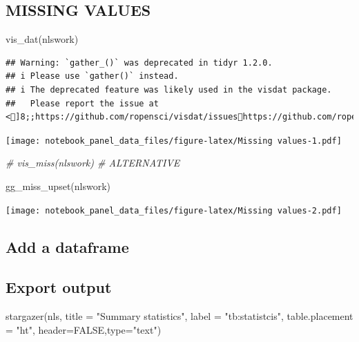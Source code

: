 \documentclass[
]{article}
\newenvironment{Shaded}{\begin{snugshade}}{\end{snugshade}}
\newcommand{\AttributeTok}[1]{\textcolor[rgb]{0.77,0.63,0.00}{#1}}
\newcommand{\CommentTok}[1]{\textcolor[rgb]{0.56,0.35,0.01}{\textit{#1}}}
\newcommand{\ConstantTok}[1]{\textcolor[rgb]{0.00,0.00,0.00}{#1}}
\newcommand{\FunctionTok}[1]{\textcolor[rgb]{0.00,0.00,0.00}{#1}}
\newcommand{\NormalTok}[1]{#1}
\newcommand{\StringTok}[1]{\textcolor[rgb]{0.31,0.60,0.02}{#1}}
\begin{document}
\hypertarget{missing-values}{%
\subsection{MISSING VALUES}\label{missing-values}}

\begin{Shaded}
\begin{Highlighting}[]
  \FunctionTok{vis\_dat}\NormalTok{(nlswork)}
\end{Highlighting}
\end{Shaded}

\begin{verbatim}
## Warning: `gather_()` was deprecated in tidyr 1.2.0.
## i Please use `gather()` instead.
## i The deprecated feature was likely used in the visdat package.
##   Please report the issue at <]8;;https://github.com/ropensci/visdat/issueshttps://github.com/ropensci/visdat/issues]8;;>.
\end{verbatim}

\texttt{[image: notebook\_panel\_data\_files/figure-latex/Missing values-1.pdf]}

\begin{Shaded}
\begin{Highlighting}[]
\CommentTok{\# vis\_miss(nlswork) \# ALTERNATIVE}

  \FunctionTok{gg\_miss\_upset}\NormalTok{(nlswork)}
\end{Highlighting}
\end{Shaded}

\texttt{[image: notebook\_panel\_data\_files/figure-latex/Missing values-2.pdf]}

\hypertarget{add-a-dataframe}{%
\subsection{Add a dataframe}\label{add-a-dataframe}}

\hypertarget{export-output}{%
\subsection{Export output}\label{export-output}}

\begin{Shaded}
\begin{Highlighting}[]
  \FunctionTok{stargazer}\NormalTok{(nls,}
            \AttributeTok{title =} \StringTok{"Summary statistics"}\NormalTok{,}
            \AttributeTok{label =} \StringTok{"tb:statistcis"}\NormalTok{,}
            \AttributeTok{table.placement =} \StringTok{"ht"}\NormalTok{,}
            \AttributeTok{header=}\ConstantTok{FALSE}\NormalTok{,}\AttributeTok{type=}\StringTok{"text"}\NormalTok{)}
\end{Highlighting}
\end{Shaded}
\end{document}

